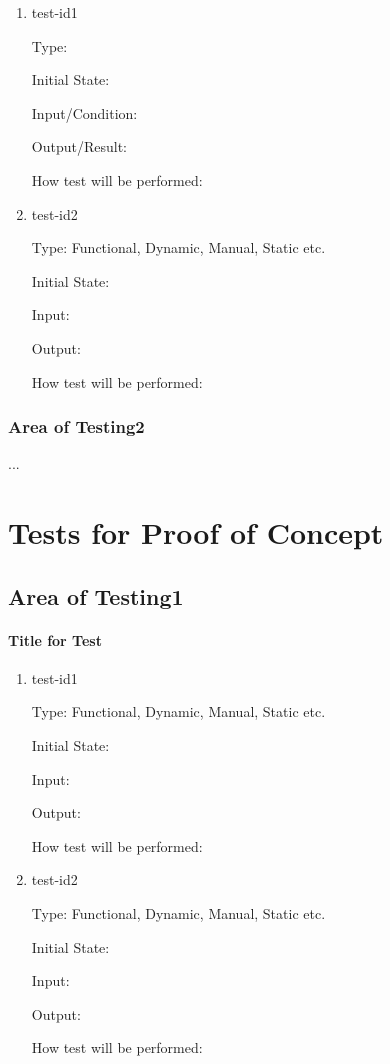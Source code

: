 \documentclass[12pt, titlepage]{article}
\begin{document}
		\begin{enumerate}

			\item{test-id1\\}

			Type: 
								
			Initial State: 
								
			Input/Condition: 
								
			Output/Result: 
								
			How test will be performed: 
								
			\item{test-id2\\}

			Type: Functional, Dynamic, Manual, Static etc.
								
			Initial State: 
								
			Input: 
								
			Output: 
								
			How test will be performed: 

		\end{enumerate}

	\subsubsection{Area of Testing2}
	...

\section{Tests for Proof of Concept}

	\subsection{Area of Testing1}
				
		\paragraph{Title for Test}

		\begin{enumerate}

		\item{test-id1\\}

		Type: Functional, Dynamic, Manual, Static etc.
							
		Initial State: 
							
		Input: 
							
		Output: 
							
		How test will be performed: 
							
		\item{test-id2\\}

		Type: Functional, Dynamic, Manual, Static etc.
							
		Initial State: 
							
		Input: 
							
		Output: 
							
		How test will be performed: 

		\end{enumerate}
\end{document}
